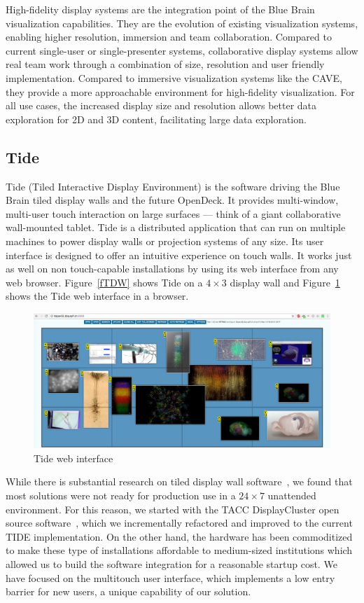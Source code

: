 \documentclass[10pt]{llncs}
\newcommand{\fig}[1]{Figure~\ref{#1}}
\begin{document}
High-fidelity display systems are the integration point of the Blue Brain
visualization capabilities. They are the evolution of existing visualization
systems, enabling higher resolution, immersion and team collaboration. Compared
to current single-user or single-presenter systems, collaborative display
systems allow real team work through a combination of size, resolution and user
friendly implementation. Compared to immersive visualization systems like the
CAVE, they provide a more approachable environment for high-fidelity
visualization. For all use cases, the increased display size and resolution
allows better data exploration for 2D and 3D content, facilitating large data
exploration.

\subsection{Tide}

Tide (Tiled Interactive Display Environment) is the software driving the Blue
Brain tiled display walls and the future OpenDeck. It provides multi-window,
multi-user touch interaction on large surfaces --- think of a giant
collaborative wall-mounted tablet. Tide is a distributed application that can
run on multiple machines to power display walls or projection systems of any
size. Its user interface is designed to offer an intuitive experience on touch
walls. It works just as well on non touch-capable installations by using its web
interface from any web browser. \fig{fTDW} shows Tide on a $4\times 3$ display
wall and \fig{fTideWeb} shows the Tide web interface in a browser.

\begin{figure}[h!t]
  \includegraphics[width=\columnwidth]{images/tideweb}
  \caption{\label{fTideWeb}Tide web interface}
\end{figure}

While there is substantial research on tiled display wall software~\cite{Sage,
Sage2, Omegalib, DK:11, JLMV:06, DisplayCluster}, we found that most solutions
were not ready for production use in a $24\times 7$ unattended environment. For
this reason, we started with the TACC DisplayCluster open source
software~\cite{DisplayCluster}, which we incrementally refactored and improved
to the current TIDE implementation. On the other hand, the hardware has been
commoditized to make these type of installations affordable to medium-sized
institutions which allowed us to build the software integration for a reasonable
startup cost. We have focused on the multitouch user interface, which implements
a low entry barrier for new users, a unique capability of our solution.
\end{document}
